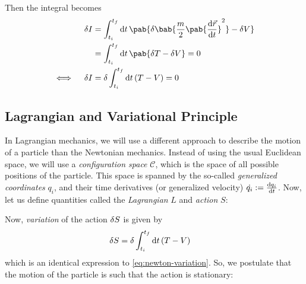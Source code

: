 Then the integral becomes
\begin{align}
  \fdif{I}            & = \int_{t_i}^{t_f} \odif{t} \, \pab{
    \delta \bab{\frac{m}{2} \pab{\odv{\vec{r}}{t}}^2}
    - \fdif{V}
  }                                                                                                   \\
                      & = \int_{t_i}^{t_f} \odif{t} \, \pab{
    \fdif{T} - \fdif{V}
  } = 0                                                                                               \\
  \iff \quad \fdif{I} & = \delta \int_{t_i}^{t_f} \odif{t} \, (T - V) = 0 \label{eq:newton-variation}
\end{align}
\cite{maeno-leastAction}


\subsection{Lagrangian and Variational Principle}
In Lagrangian mechanics, we will use a different approach to describe the motion of a particle than the Newtonian mechanics.
Instead of using the usual Euclidean space, we will use a \textit{configuration space} $\mathcal{C}$, which is the space of all possible positions of the particle.
This space is spanned by the so-called \emph{generalized coordinates} $q_i$, and their time derivatives (or generalized velocity) $\dot{q_i} := \odv{q_i}{t}$.
Now, let us define quantities called the \emph{Lagrangian} $L$ and \emph{action} $S$:

Now, \emph{variation} of the action $\fdif{S}$ is given by
\begin{align}
  \fdif{S} & = \delta \int_{t_i}^{t_f} \odif{t} \, (T - V)
\end{align}
which is an identical expression to \eqref{eq:newton-variation}.
So, we postulate that the motion of the particle is such that the action is stationary:

